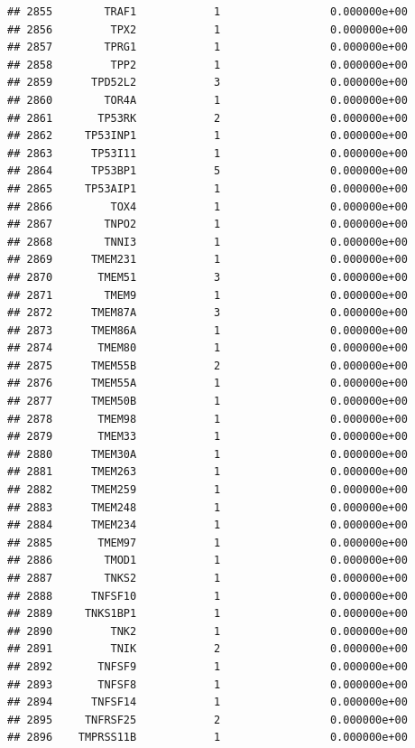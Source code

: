 \documentclass[
]{article}
\begin{document}
\begin{verbatim}
## 2855        TRAF1            1                 0.000000e+00
## 2856         TPX2            1                 0.000000e+00
## 2857        TPRG1            1                 0.000000e+00
## 2858         TPP2            1                 0.000000e+00
## 2859      TPD52L2            3                 0.000000e+00
## 2860        TOR4A            1                 0.000000e+00
## 2861       TP53RK            2                 0.000000e+00
## 2862     TP53INP1            1                 0.000000e+00
## 2863      TP53I11            1                 0.000000e+00
## 2864      TP53BP1            5                 0.000000e+00
## 2865     TP53AIP1            1                 0.000000e+00
## 2866         TOX4            1                 0.000000e+00
## 2867        TNPO2            1                 0.000000e+00
## 2868        TNNI3            1                 0.000000e+00
## 2869      TMEM231            1                 0.000000e+00
## 2870       TMEM51            3                 0.000000e+00
## 2871        TMEM9            1                 0.000000e+00
## 2872      TMEM87A            3                 0.000000e+00
## 2873      TMEM86A            1                 0.000000e+00
## 2874       TMEM80            1                 0.000000e+00
## 2875      TMEM55B            2                 0.000000e+00
## 2876      TMEM55A            1                 0.000000e+00
## 2877      TMEM50B            1                 0.000000e+00
## 2878       TMEM98            1                 0.000000e+00
## 2879       TMEM33            1                 0.000000e+00
## 2880      TMEM30A            1                 0.000000e+00
## 2881      TMEM263            1                 0.000000e+00
## 2882      TMEM259            1                 0.000000e+00
## 2883      TMEM248            1                 0.000000e+00
## 2884      TMEM234            1                 0.000000e+00
## 2885       TMEM97            1                 0.000000e+00
## 2886        TMOD1            1                 0.000000e+00
## 2887        TNKS2            1                 0.000000e+00
## 2888      TNFSF10            1                 0.000000e+00
## 2889     TNKS1BP1            1                 0.000000e+00
## 2890         TNK2            1                 0.000000e+00
## 2891         TNIK            2                 0.000000e+00
## 2892       TNFSF9            1                 0.000000e+00
## 2893       TNFSF8            1                 0.000000e+00
## 2894      TNFSF14            1                 0.000000e+00
## 2895     TNFRSF25            2                 0.000000e+00
## 2896    TMPRSS11B            1                 0.000000e+00

\end{verbatim}
\end{document}
